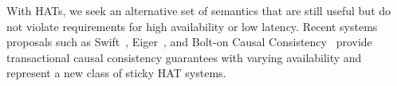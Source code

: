 With HATs, we seek an alternative set of semantics that are still
useful but do not violate requirements for high availability or low
latency. Recent systems proposals such as Swift~\cite{swift},
Eiger~\cite{eiger}, and Bolt-on Causal Consistency~\cite{bolton}
provide transactional causal consistency guarantees with varying
availability and represent a new class of sticky HAT systems.








